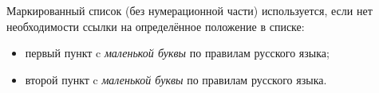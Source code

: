 Маркированный список (без нумерационной части) используется, если нет необходимости ссылки на определённое положение в списке:
\begin{itemize}
	\item первый пункт c {\itshape маленькой буквы} по правилам русского языка;
	\item второй пункт c {\itshape маленькой буквы} по правилам русского языка.
\end{itemize}